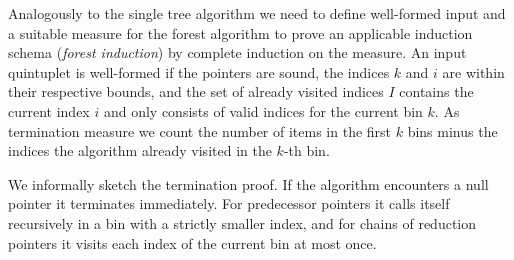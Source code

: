 \begin{isabellebody}
\isadelimdocument
%
\endisadelimdocument
%
\isatagdocument
%
\isamarkuptrue%
%
\endisatagdocument
{\isafolddocument}%
%
\isadelimdocument
%
\endisadelimdocument
%
\begin{isamarkuptext}%
Analogously to the single tree algorithm we need to define well-formed input and a suitable
measure for the forest algorithm to prove an applicable induction schema (\textit{forest induction}) by
complete induction on the measure. An input quintuplet  is well-formed if
the pointers are sound, the indices $k$ and $i$ are within their respective bounds, and the set of already
visited indices $I$ contains the current index $i$ and only consists of valid indices for the current bin $k$.
As termination measure we count the number of items in the first $k$ bins minus the indices the algorithm
already visited in the $k$-th bin.

We informally sketch the termination proof. If the algorithm encounters a null pointer it terminates immediately.
For predecessor pointers it calls itself recursively in a bin with a strictly smaller index, and for chains of reduction
pointers it visits each index of the current bin at most once.


\end{isamarkuptext}
\end{isabellebody}
